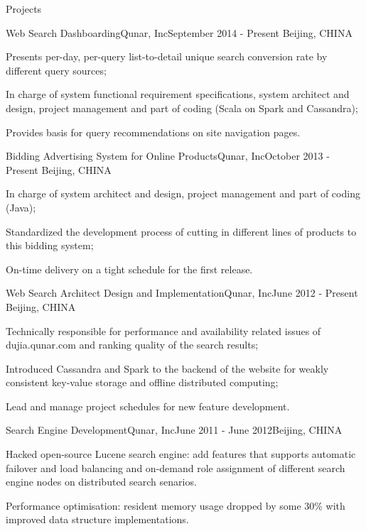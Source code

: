 \documentclass{resume} %
\begin{document}
\begin{rSection}{Projects}

\begin{rSubsection}{Web Search Dashboarding}{Qunar, Inc}{September 2014 - Present}
{Beijing, CHINA}
\item Presents per-day, per-query list-to-detail unique search conversion rate by different query sources;
\item In charge of system functional requirement specifications, system architect and design, project management and part of coding (Scala on Spark and Cassandra);
\item Provides basis for query recommendations on site navigation pages.
\end{rSubsection}

\begin{rSubsection}{Bidding Advertising System for Online Products}{Qunar, Inc}{October 2013 - Present}
{Beijing, CHINA}
\item In charge of system architect and design, project management and part of coding (Java);
\item Standardized the development process of cutting in different lines of products to this bidding system;
\item On-time delivery on a tight schedule for the first release.
\end{rSubsection}

\begin{rSubsection}{Web Search Architect Design and Implementation}{Qunar, Inc}{June 2012 - Present}
{Beijing, CHINA}
\item Technically responsible for performance and availability related issues of dujia.qunar.com and ranking 
quality of the search results;
\item Introduced Cassandra and Spark to the backend of the website for weakly consistent key-value storage and offline distributed
 computing;
\item Lead and manage project schedules for new feature development.

\end{rSubsection}

\begin{rSubsection}{Search Engine Development}{Qunar, Inc}{June 2011 -
    June 2012}{Beijing, CHINA}
\item Hacked open-source Lucene search engine: add features that supports automatic failover and load balancing and on-demand role assignment of different search engine nodes on distributed search senarios.
\item Performance optimisation: resident memory usage dropped by some 30\% with improved data structure implementations.
\end{rSubsection}


\end{rSection}
\end{document}

